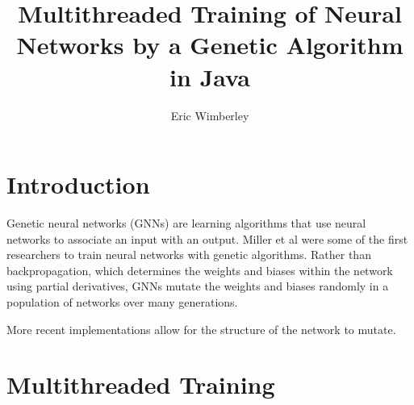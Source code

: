 \documentclass[twocolumn]{article}
\title{Multithreaded Training of Neural Networks by a Genetic Algorithm in Java}
\author{Eric Wimberley}
\begin{document}
\maketitle

\begin{abstract}
\lipsum[1-2]
\end{abstract}

\section{Introduction}
Genetic neural networks (GNNs) are learning algorithms that use neural networks to associate an input with an output. Miller et al were some of the first researchers to train neural networks with genetic algorithms\cite{MillerToddHedge}. Rather than backpropagation, which determines the weights and biases within the network using partial derivatives, GNNs mutate the weights and biases randomly in a population of networks over many generations.

More recent implementations allow for the structure of the network to mutate\cite{LamStructure}.

\section{Multithreaded Training}

\printbibliography
\end{document}
